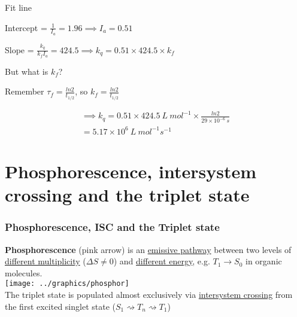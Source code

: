 \documentclass[ignorenonframetext]{beamer}
\begin{document}
\begin{frame}[fragile]
\begin{example}
Fit line

Intercept = \(\frac{1}{I_a} = 1.96 \implies I_a=0.51\)

Slope = \(\frac{k_q}{k_fI_a} = 424.5 \implies k_q=0.51\times 424.5\times k_f\)

\medskip But what is \(k_f\)?
\end{example}
\end{frame}

\begin{frame}
\begin{example}
Remember \(\tau_f = \frac{ln2}{t_{1/2}}\), so \(k_f = \frac{ln2}{t_{1/2}}\)

\bigskip \begin{multline*}\implies k_q = 0.51 \times 424.5\ L\ mol^{-1} \times \frac{ln2}{29\times 10^{-6}\ s}\\=5.17\times 10^6\ L\ mol^{-1}s^{-1}\end{multline*}
\end{example}
\end{frame}

\section{Phosphorescence, intersystem crossing and the triplet state}
\begin{frame}
\frametitle{Phosphorescence, ISC and the Triplet state}
\textbf{Phosphorescence} (pink arrow) is an \underline{emissive pathway} between two levels of \underline{different multiplicity} (\(\Delta S \neq 0\)) and \underline{different energy}, e.g. \(T_1 \rightarrow S_0\) in organic molecules.\\
\texttt{[image: ../graphics/phosphor]}\\
The triplet state is populated almost exclusively via \underline{intersystem crossing} from the first excited singlet state  (\(S_1 \rightsquigarrow T_n \rightsquigarrow T_1\))
\end{frame}
\end{document}
